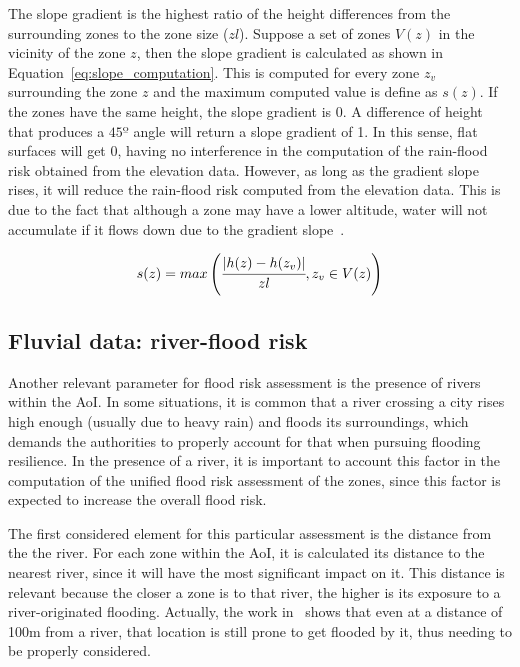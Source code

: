 \begin{refsection}
The slope gradient is the highest ratio of the height differences from the surrounding zones to the zone size ($zl$). Suppose a set of zones $V(z)$ in the vicinity of the zone $z$, then the slope gradient is calculated as shown in Equation~\ref{eq:slope_computation}. This is computed for every zone $z_v$ surrounding the zone $z$ and the maximum computed value is define as $s(z)$. If the zones have the same height, the slope gradient is 0. A difference of height that produces a $45º$ angle will return a slope gradient of 1. In this sense, flat surfaces will get 0, having no interference in the computation of the rain-flood risk obtained from the elevation data. However, as long as the gradient slope rises, it will reduce the rain-flood risk computed from the elevation data. This is due to the fact that although a zone may have a lower altitude, water will not accumulate if it flows down due to the gradient slope~\cite{elevation1}.

\begin{equation}
    \label{eq:slope_computation}
    s(z) = max \left( \cfrac{|h(z) - h(z_v)|}{zl}, z_v \in V(z) \right)
\end{equation}

\subsection{Fluvial data: river-flood risk}

Another relevant parameter for flood risk assessment is the presence of rivers within the AoI. In some situations, it is common that a river crossing a city rises high enough (usually due to heavy rain) and floods its surroundings, which demands the authorities to properly account for that when pursuing flooding resilience. In the presence of a river, it is important to account this factor in the computation of the unified flood risk assessment of the zones, since this factor is expected to increase the overall flood risk.

The first considered element for this particular assessment is the distance from the the river. For each zone within the AoI, it is calculated its distance to the nearest river, since it will have the most significant impact on it. This distance is relevant because the closer a zone is to that river, the higher is its exposure to a river-originated flooding. Actually, the work in~\cite{distance1} shows that even at a distance of 100m from a river, that location is still prone to get flooded by it, thus needing to be properly considered.


\end{refsection}
